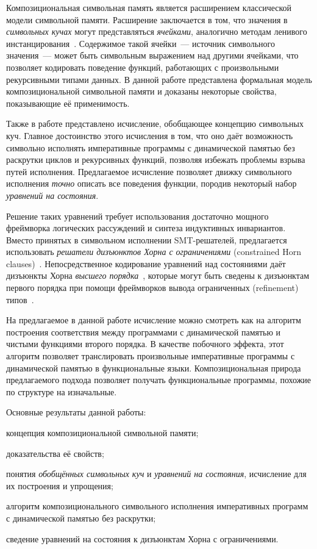 Композициональная символьная память является расширением классической модели символьной памяти. Расширение заключается в том, что значения в \emph{символьных кучах} могут представляться  \emph{ячейками}, аналогично методам ленивого инстанцирования~\cite{khurshid2003generalized}. Содержимое такой ячейки~--- источник символьного значения~--- может быть символьным выражением над другими ячейками, что позволяет кодировать поведение функций, работающих с произвольными рекурсивными типами данных. В данной работе представлена формальная модель композициональной символьной памяти и доказаны некоторые свойства, показывающие её применимость.

Также в работе представлено исчисление, обобщающее концепцию символьных куч. Главное достоинство этого исчисления в том, что оно даёт возможность символьно исполнять императивные программы с динамической памятью без раскрутки циклов и рекурсивных функций, позволяя избежать проблемы взрыва путей исполнения. Предлагаемое исчисление позволяет движку символьного исполнения \emph{точно} описать все поведения функции, породив некоторый набор \emph{уравнений на состояния}.

Решение таких уравнений требует использования достаточно мощного фреймворка логических рассуждений и синтеза индуктивных инвариантов. Вместо принятых в символьном исполнении SMT-решателей, предлагается использовать \emph{решатели дизъюнктов Хорна с ограничениями} (constrained Horn clauses)~\cite{bjorner2015horn}. Непосредственное кодирование уравнений над состояниями даёт дизъюнкты Хорна \emph{высшего порядка}~\cite{cathcart2017higher}, которые могут быть сведены к дизъюнктам первого порядка при помощи фреймворков вывода ограниченных (refinement) типов~\cite{vazou2015bounded,unno2013automating,zhu2013compositional}.

На предлагаемое в данной работе исчисление можно смотреть как на алгоритм построения соответствия между программами с динамической памятью и чистыми функциями второго порядка. В качестве побочного эффекта, этот алгоритм позволяет транслировать произвольные императивные программы с динамической памятью в функциональные языки. Композициональная природа предлагаемого подхода позволяет получать функциональные программы, похожие по структуре на изначальные.

Основные результаты данной работы:
\begin{enumerate*}
    \item концепция композициональной символьной памяти;
    \item доказательства её свойств;
    \item понятия \emph{обобщённых символьных куч} и \emph{уравнений на состояния}, исчисление для их построения и упрощения;
    \item алгоритм композиционального символьного исполнения императивных программ с динамической памятью без раскрутки;
    \item сведение уравнений на состояния к дизъюнктам Хорна с ограничениями.
\end{enumerate*}
